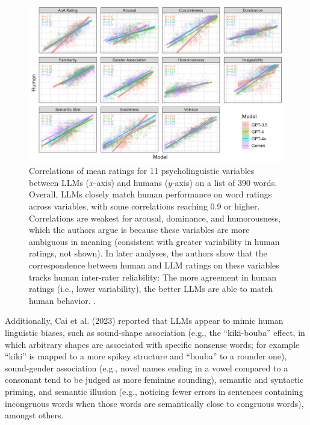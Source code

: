 \begin{figure}[ht]
\centering
\includegraphics[scale=.8]{./images/humanVsLLM.png}
\caption[Figure borrowed from Kello et al. (2025, under review) with author
permission.]{Correlations of mean ratings  for 11 psycholinguistic variables
between LLMs ($x$-axis) and humans ($y$-axis) on a list of 390 words. Overall,
LLMs closely match human performance on word ratings across variables, with
some correlations reaching 0.9 or higher. Correlations are weakest for arousal,
dominance, and humorousness, which the authors argue is because these variables
are more ambiguous in meaning (consistent with greater variability in human
ratings, not shown). In later analyses, the authors show that the
correspondence between human and LLM ratings on these variables tracks human
inter-rater reliability: The more agreement in human ratings (i.e., lower
variability), the better LLMs are able to match human behavior. .}
\label{humanVsLLM}
\end{figure}

Additionally, Cai et al. (2023) reported that LLMs appear to mimic human
linguistic biases, such as sound-shape association (e.g., the ``kiki-bouba''
effect, in which arbitrary shapes are associated with specific nonsense words;
for example ``kiki'' is mapped to a more spikey structure and ``bouba'' to a
rounder one), sound-gender association (e.g., novel names ending in a vowel
compared to a consonant tend to be judged as more feminine sounding), semantic
and syntactic priming, and semantic illusion (e.g., noticing fewer errors in
sentences containing incongruous words when those words are semantically close
to congruous words), amongst others.

